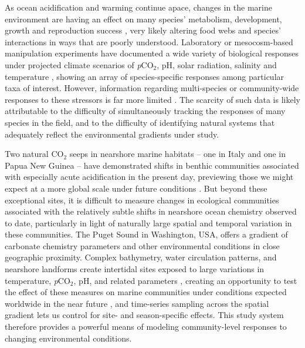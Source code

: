 \documentclass[11pt]{article}
\begin{document}
\begin{linenumbers}
As ocean acidification and warming continue apace, changes in the marine environment are having an effect on many species' metabolism, development, growth and reproduction success \cite{kroeker2010meta, espinel2018effects, bednarsek2019systematic, clements2018eating}, very likely altering food webs \cite{Riebesell:2018aa, Busch2013Potential, heiden2019impact} and species' interactions in ways that are poorly understood. Laboratory or mesocosm-based manipulation experiments have documented a wide variety of biological responses under projected climate scenarios of \textit{p}CO$_2$, pH, solar radiation, salinity and temperature \cite{Gao2012,delorme2014temperature, kurihara2008effects}, showing an array of species-specific responses among particular taxa of interest. However, information regarding multi-species or community-wide responses to these stressors is far more limited \cite{kroeker2011divergent, jokiel2008ocean}. The scarcity of such data is likely attributable to the difficulty of simultaneously tracking the responses of many species in the field, and to the difficulty of identifying natural systems that adequately reflect the environmental gradients under study.

Two natural CO$_2$ seeps in nearshore marine habitats -- one in Italy and one in Papua New Guinea -- have demonstrated shifts in benthic communities associated with especially acute acidification in the present day, previewing those we might expect at a more global scale under future conditions \cite{kroeker2011divergent, fabricius2015situ}. But beyond these exceptional sites, it is difficult to measure changes in ecological communities associated with the relatively subtle shifts in nearshore ocean chemistry observed to date, particularly in light of naturally large spatial and temporal variation in these communities. The Puget Sound in Washington, USA, offers a gradient of carbonate chemistry parameters and other environmental conditions in close geographic proximity. Complex bathymetry, water circulation patterns, and nearshore landforms create intertidal sites exposed to large variations in temperature, \textit{p}CO$_2$, pH, and related parameters \cite{khangaonkar2019salish}, creating an opportunity to test the effect of these measures on marine communities under conditions expected worldwide in the near future \cite{murray2015inland}, and time-series sampling across the spatial gradient lets us control for site- and season-specific effects. This study system therefore provides a powerful means of modeling community-level responses to changing environmental conditions.



\end{linenumbers}
\end{document}
